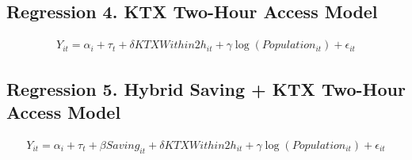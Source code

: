 \documentclass[a4paper, 10pt]{article}
\begin{document}
\begin{table}[H]
\centering
\caption{Regression 3. Hybrid Saving + Two-Hour Access Model: 의사}

\end{table}

\subsection{Regression 4. KTX Two-Hour Access Model}
\begin{align*}
    Y_{it}=\alpha_i+\tau_t+\delta KTXWithin2h_{it}+\gamma\log(Population_{it})+\epsilon_{it}
\end{align*}
\begin{table}[H]
\centering
\caption{Regression 4. KTX Two-Hour Access Model: 의원}

\end{table}

\begin{table}[H]
\centering
\caption{Regression 4. KTX Two-Hour Access Model: 병원}

\end{table}

\begin{table}[H]
\centering
\caption{Regression 4. KTX Two-Hour Access Model: 종합병원}

\end{table}

\begin{table}[H]
\centering
\caption{Regression 4. KTX Two-Hour Access Model: 상급종합병원}

\end{table}

\begin{table}[H]
\centering
\caption{Regression 4. KTX Two-Hour Access Model: 의사}

\end{table}

\subsection{Regression 5. Hybrid Saving + KTX Two-Hour Access Model}
\begin{align*}
    Y_{it}=\alpha_i+\tau_t+\beta Saving_{it}+\delta KTXWithin2h_{it}+\gamma\log(Population_{it})+\epsilon_{it}
\end{align*}
\begin{table}[H]
\centering
\caption{Regression 5. Hybrid Saving + KTX Two-Hour Access Model: 의원}

\end{table}
\end{document}

